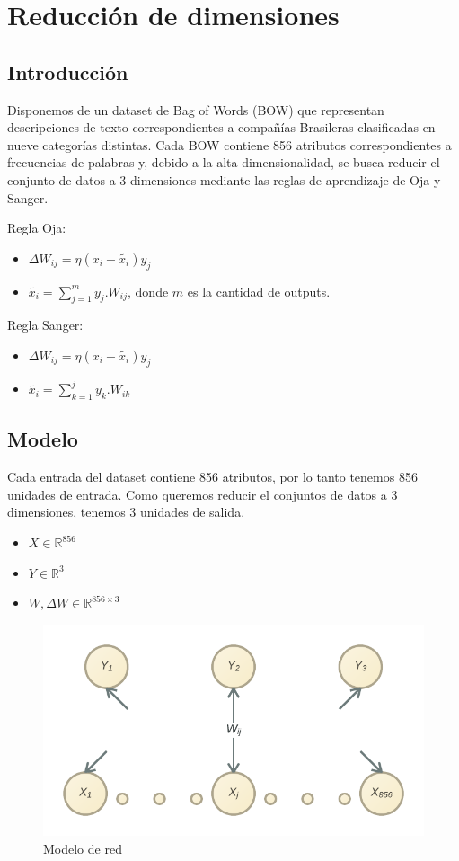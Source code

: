 \section{Reducción de dimensiones}

\subsection{Introducción}

Disponemos de un dataset de Bag of Words (BOW) que representan descripciones de texto correspondientes a compañías Brasileras clasificadas en nueve categorías distintas. Cada BOW contiene 856 atributos correspondientes a frecuencias de palabras y, debido a la alta dimensionalidad, se busca reducir el conjunto de datos a 3 dimensiones mediante las reglas de aprendizaje de Oja y Sanger.

Regla Oja:
\begin{itemize}
	\item$\Delta W_{ij} = \eta (x_i - \widetilde{x_i}) y_j$
	\item$\widetilde{x_i} = \sum_{j=1}^m y_j . W_{ij}$, donde $m$ es la cantidad de outputs.
\end{itemize}

Regla Sanger:
\begin{itemize}
	\item$\Delta W_{ij} = \eta (x_i - \widetilde{x_i}) y_j$
	\item$\widetilde{x_i} = \sum_{k=1}^j y_k . W_{ik}$
\end{itemize}

\subsection{Modelo}

Cada entrada del dataset contiene 856 atributos, por lo tanto tenemos 856 unidades de entrada. Como queremos reducir el conjuntos de datos a 3 dimensiones, tenemos 3 unidades de salida.

\begin{itemize}
	\item$X \in \mathbb{R}^{856}$
	\item$Y \in \mathbb{R}^3$
	\item$W, \Delta W \in \mathbb{R}^{856\times 3}$
\end{itemize}

\begin{figure}[ht!]
	\centering
	\includegraphics[width=0.7\linewidth]{img/parte1-modelo.png}

	\caption{Modelo de red}
\end{figure}

